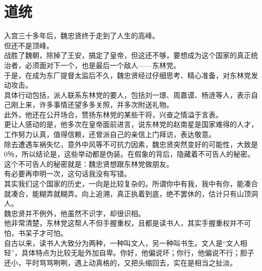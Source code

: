 \section{道统}
\ifnum{}
	\begin{multicols}{\theparacolNo}
\fi
入宫三十多年后，魏忠贤终于走到了人生的高峰。\\

但还不是顶峰。\\

战胜了魏朝，除掉了王安，搞定了皇帝，但这还不够，要想成为这个国家的真正统治者，必须面对下一个，也是最后一个敌人——东林党。\\

于是，在成为东厂提督太监后不久，魏忠贤经过仔细思考、精心准备，对东林党发动攻击。\\

具体行动包括，派人联系东林党的要人，包括刘一璟、周嘉谟、杨涟等人，表示自己刚上来，许多事情还望多多关照，并多次附送礼物。\\

此外，他还在公开场合，赞扬东林党的某些干将，兴奋之情溢于言表。\\

更让人感动的是，他多次在皇帝面前进言，说东林党的赵南星是国家难得的人才，工作努力认真，值得信赖，还曾派自己的亲信上门拜访，表达敬意。\\

除去遭遇车祸失忆，意外中风等不可抗力因素，魏忠贤突然变好的可能性，大致是0％，所以结论是，这些举动都是伪装。在假象的背后，隐藏着不可告人的秘密。\\

这个不可告人的秘密就是：魏忠贤想跟东林党做朋友。\\

有必要再申明一次，这句话我没有写错。\\

其实我们这个国家的历史，一向是比较复杂的。所谓你中有我，我中有你，能凑合就凑合，能糊弄就糊弄。向上追溯，真正执着到底，绝不罢休的，估计只有山顶洞人。\\

魏忠贤并不例外，他虽然不识字，却很识相。\\

他非常清楚，东林党这帮人不但手握重权，且都是读书人，其实手握重权并不可怕，书呆子才可怕。\\

自古以来，读书人大致分为两种，一种叫文人，另一种叫书生。文人是“文人相轻”，具体特点为比较无耻外加自卑。你好，他偏说坏；你行，他偏说不行；胆子还小，平时骂骂咧咧，遇上动真格的，又把头缩回去，实在是相当之扯淡。\\


\end{multicols}
